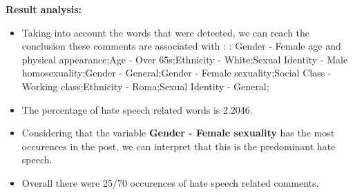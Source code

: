 \documentclass[11pt]{article}
\begin{document}
\textbf{\Large Result analysis:}

\begin{itemize}\item Taking into account the words that were detected, we can reach the conclusion these comments are associated with : : Gender - Female age and physical appearance;Age - Over 65s;Ethnicity - White;Sexual Identity - Male homosexuality;Gender - General;Gender - Female sexuality;Social Class - Working class;Ethnicity - Roma;Sexual Identity - General;%

\item The percentage of hate speech related words is 2.2046.

\item Considering that the variable \textbf{Gender - Female sexuality} has the most occurences in the post, we can interpret that this is the predominant hate speech.

\item Overall there were 25/70 occurences of hate speech related comments.\end{itemize}
\end{document}
